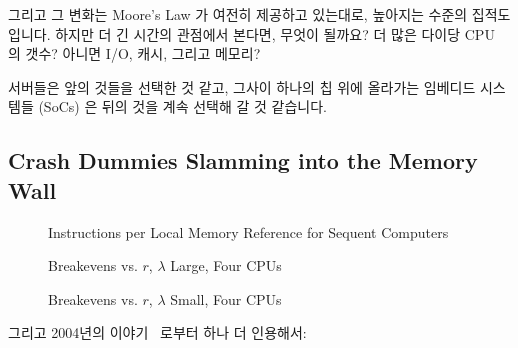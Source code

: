 그리고 그 변화는 Moore's Law 가 여전히 제공하고 있는대로, 높아지는 수준의
집적도입니다.
하지만 더 긴 시간의 관점에서 본다면, 무엇이 될까요?
더 많은 다이당 CPU 의 갯수?
아니면 I/O, 캐시, 그리고 메모리?

서버들은 앞의 것들을 선택한 것 같고, 그사이 하나의 칩 위에 올라가는 임베디드
시스템들 (SoCs) 은 뒤의 것을 계속 선택해 갈 것 같습니다.

\subsection{Crash Dummies Slamming into the Memory Wall}
\label{sec:future:Crash Dummies Slamming into the Memory Wall}

\begin{figure}[tbp]
\centering
\epsfxsize=3in
\caption{Instructions per Local Memory Reference for Sequent Computers}
\label{fig:future:Instructions per Local Memory Reference for Sequent Computers}
\end{figure}

\begin{figure}[htbp]
\centering
\epsfxsize=3in
\caption{Breakevens vs. $r$, $\lambda$ Large, Four CPUs}
\label{fig:future:Breakevens vs. r, lambda Large, Four CPUs}
\end{figure}

\begin{figure}[htbp]
\centering
\epsfxsize=3in
\caption{Breakevens vs. $r$, $\lambda$ Small, Four CPUs}
\label{fig:future:Breakevens vs. r, Worst-Case lambda, Four CPUs}
\end{figure}

그리고 2004년의 이야기~\cite{PaulEdwardMcKenneyPhD} 로부터 하나 더 인용해서:

